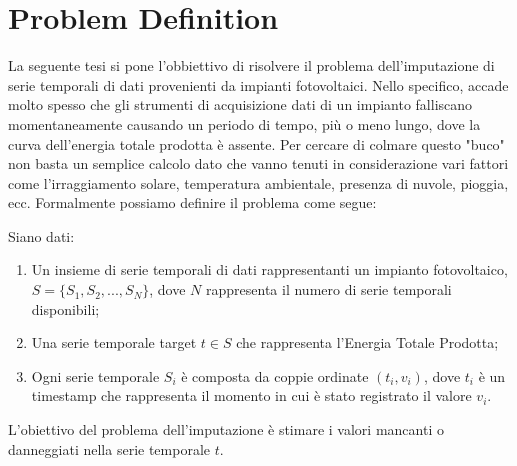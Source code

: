 \section{Problem Definition}
La seguente tesi si pone l'obbiettivo di risolvere il problema dell'imputazione
di serie temporali di dati provenienti da impianti fotovoltaici. Nello
specifico, accade molto spesso che gli strumenti di acquisizione dati di un
impianto falliscano momentaneamente causando un periodo di tempo, più o meno
lungo, dove la curva dell'energia totale prodotta è assente. Per cercare di
colmare questo "buco" non basta un semplice calcolo dato che vanno tenuti in
considerazione vari fattori come l'irraggiamento solare, temperatura ambientale,
presenza di nuvole, pioggia, ecc.
Formalmente possiamo definire il problema come segue:\\

\begin{definition}
    Siano dati:
    \begin{enumerate}
        \item  Un insieme di serie temporali di dati rappresentanti un impianto
              fotovoltaico, $S = \{S_1, S_2, ..., S_N\}$, dove $N$ rappresenta
              il numero di serie temporali disponibili;
        \item Una serie temporale target $t \in S$ che rappresenta l'Energia
              Totale Prodotta;
        \item Ogni serie temporale $S_i$ è composta da coppie ordinate $(t_i, v_i)$,
              dove $t_i$ è un timestamp che rappresenta il momento in cui è stato
              registrato il valore $v_i$.
    \end{enumerate}

    L'obiettivo del problema dell'imputazione è stimare i valori mancanti o
    danneggiati nella serie temporale $t$.
\end{definition}







